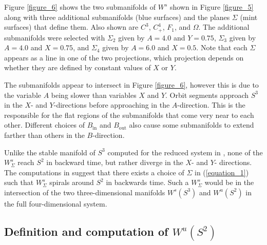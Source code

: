 \documentclass{ws-ijbc}
\begin{document}
Figure \ref{figure_6} shows the two submanifolds of $W^{s}$ shown in Figure \ref{figure_5} along with three additional submanifolds (blue surfaces) and the planes $\Sigma$ (mint surfaces) that define them.  Also shown are $C^3$, $C^4_+$, $F_1$, and $\Omega$.  The additional submanifolds were selected with $\Sigma_2$ given by $A=4.0$ and $Y=0.75$, $\Sigma_3$ given by $A=4.0$ and $X=0.75$, and $\Sigma_4$ given by $A=6.0$ and $X=0.5$.  Note that each $\Sigma$ appears as a line in one of the two projections, which projection depends on whether they are defined by constant values of $X$ or $Y$.  

The submanifolds appear to intersect in Figure \ref{figure_6}, however this is due to the variable $A$ being slower than variables $X$ and $Y$.  Orbit segments approach $S^3$ in the $X$- and $Y$-directions before approaching in the $A$-direction.  This is the responsible for the flat regions of the submanifolds that come very near to each other.  Different choices of $B_{\text{in}}$ and $B_{\text{out}}$ also cause some submanifolds to extend farther than others in the $B$-direction.
    
Unlike the stable manifold of $S^3$ computed for the reduced system in \cite{QSSA}, none of the $W^{s}_{\Sigma}$ reach $S^2$ in backward time, but rather diverge in the $X$- and $Y$- directions.  The computations in \cite{QSSA} suggest that there exists a choice of $\Sigma$ in (\ref{equation_1}) such that $W^s_{\Sigma}$ spirals around $S^2$ in backwards time.  Such a $W^s_{\Sigma}$ would be in the intersection of the two three-dimensional manifolds $W^s(S^3)$ and $W^u(S^2)$ in the full four-dimensional system.  

\subsection{Definition and computation of $W^{u}(S^2)$}  
\end{document}

